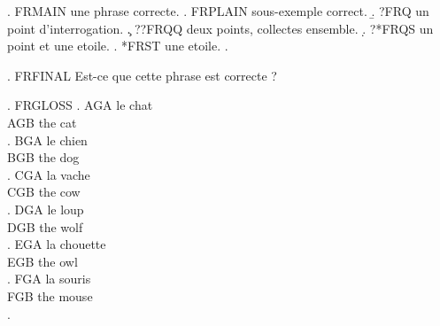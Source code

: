 
\usepackage{polyglossia}
\setdefaultlanguage{french}

\ex. FRMAIN une phrase correcte.
\a. FRPLAIN sous-exemple correct.
\b. ?FRQ un point d'interrogation.
\c. ??FRQQ deux points, collectes ensemble.
\d. ?*FRQS un point et une etoile.
\e. *FRST une etoile.
\z.

\ex. FRFINAL Est-ce que cette phrase est correcte ?

\ex. FRGLOSS
\ag. AGA le chat \\ AGB the cat \\
\bg. BGA le chien \\ BGB the dog \\
\cg. CGA la vache \\ CGB the cow \\
\dg. DGA le loup \\ DGB the wolf \\
\eg. EGA la chouette \\ EGB the owl \\
\fg. FGA la souris \\ FGB the mouse \\
\z.

